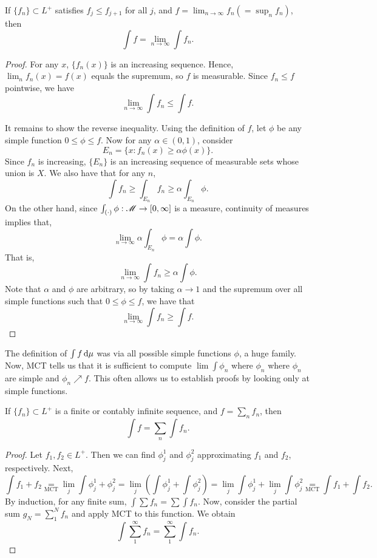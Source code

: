 \documentclass[12pt]{article} %
\begin{document}
\begin{theorem}
    If $\{f_n\} \subset L^+$ satisfies $f_j \leq f_{j+1}$ for all $j$, and $f = \lim_{n \to \infty} f_n (= \sup_n f_n)$, then \[\int f = \lim_{n \to \infty} \int f_n.\]
\end{theorem}

\begin{proof}
    For any $x$, $\{f_n(x)\}$ is an increasing sequence. Hence, $\lim_n f_n(x) = f(x)$ equals the supremum, so $f$ is measurable. Since $f_n \leq f$ pointwise, we have \[\lim_{n \to \infty} \int f_n \leq \int f.\]

    It remains to show the reverse inequality. Using the definition of $f$, let $\phi$ be any simple function $0 \leq \phi \leq f$. Now for any $\alpha \in (0,1)$, consider \[E_n = \{x : f_n(x) \geq \alpha \phi(x)\} .\] Since $f_n$ is increasing, $\{E_n\}$ is an increasing sequence of measurable sets whose union is $X$. We also have that for any $n$, \[\int f_n \geq \int_{E_n} f_n \geq \alpha \int_{E_n} \phi.\] On the other hand, since $\int_{(\cdot)}\phi : \mathscr{M} \to [0,\infty]$ is a measure, continuity of measures implies that, \[\lim_{n \to \infty} \alpha \int_{E_n} \phi = \alpha \int \phi.\] That is, \[\lim_{n \to \infty} \int f_n \geq \alpha \int \phi.\] Note that $\alpha$ and $\phi$ are arbitrary, so by taking $\alpha \to 1$ and the supremum over all simple functions such that $0 \leq \phi \leq f$, we have that \[\lim_{n \to \infty} \int f_n \geq \int f.\]
\end{proof}

\begin{remark}
    The definition of $\int f \, \mathrm{d} \mu$ was via all possible simple functions $\phi$, a huge family. Now, MCT tells us that it is sufficient to compute $\lim \int \phi_n$ where $\phi_n$ where $\phi_n$ are simple and $\phi_n \nearrow f$. This often allows us to establish proofs by looking only at simple functions.
\end{remark}

\begin{theorem}\label{thm:2.15}
    If $\{f_n\} \subset L^+$ is a finite or contably infinite sequence, and $f = \sum_n f_n$, then \[\int f = \sum_n \int f_n.\]
\end{theorem}

\begin{proof}
    Let $f_1, f_2 \in L^+$. Then we can find $\phi_j^1$ and $\phi_j^2$ approximating $f_1$ and $f_2$, respectively. Next, \[\int f_1 + f_2 \underset{\text{MCT}}{=} \lim_j \int \phi_j^1 + \phi_j^2 = \lim_j \left( \int \phi_j^1 + \int \phi_j^2 \right) = \lim_j \int \phi_j^1 + \lim_j \int \phi_j^2 \underset{\text{MCT}}{=} \int f_1 + \int f_2.\] By induction, for any finite sum, $\int \sum f_n = \sum \int f_n$. Now, consider the partial sum $g_N = \sum_1^N f_n$ and apply MCT to this function. We obtain \[\int \sum_1^\infty f_n = \sum_1^\infty \int f_n.\]
\end{proof}
\end{document}
